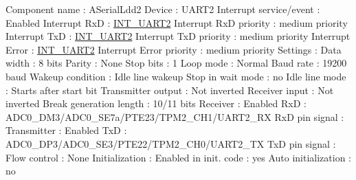 \begin{DoxyCode}
            Component name                                 : ASerialLdd2
            Device                                         : UART2
            Interrupt service/event                        : Enabled
              Interrupt RxD                                : \hyperlink{group___interrupt__vector__numbers_gga5f3656e2a154b64aa378a2f3856c3a8da430d09ab19cb610205e57ef6d2654c63}{INT\_UART2}
              Interrupt RxD priority                       : medium priority
              Interrupt TxD                                : \hyperlink{group___interrupt__vector__numbers_gga5f3656e2a154b64aa378a2f3856c3a8da430d09ab19cb610205e57ef6d2654c63}{INT\_UART2}
              Interrupt TxD priority                       : medium priority
              Interrupt Error                              : \hyperlink{group___interrupt__vector__numbers_gga5f3656e2a154b64aa378a2f3856c3a8da430d09ab19cb610205e57ef6d2654c63}{INT\_UART2}
              Interrupt Error priority                     : medium priority
            Settings                                       : 
              Data width                                   : 8 bits
              Parity                                       : None
              Stop bits                                    : 1
              Loop mode                                    : Normal
              Baud rate                                    : 19200 baud
              Wakeup condition                             : Idle line wakeup
              Stop in wait mode                            : no
              Idle line mode                               : Starts after start bit
              Transmitter output                           : Not inverted
              Receiver input                               : Not inverted
              Break generation length                      : 10/11 bits
              Receiver                                     : Enabled
                RxD                                        : ADC0\_DM3/ADC0\_SE7a/PTE23/TPM2\_CH1/UART2\_RX
                RxD pin signal                             : 
              Transmitter                                  : Enabled
                TxD                                        : ADC0\_DP3/ADC0\_SE3/PTE22/TPM2\_CH0/UART2\_TX
                TxD pin signal                             : 
              Flow control                                 : None
            Initialization                                 : 
              Enabled in init. code                        : yes
              Auto initialization                          : no

\end{DoxyCode}
